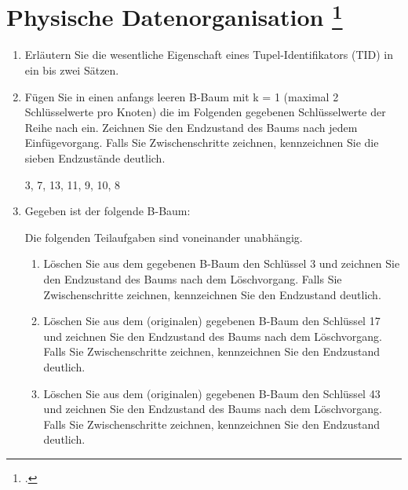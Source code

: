 \documentclass{lehramt-informatik-aufgabe}
\begin{document}
\liAufgabenTitel{}
\section{Physische Datenorganisation
\footcite{66116:2016:09}}
\begin{enumerate}


\item Erläutern Sie die wesentliche Eigenschaft eines
Tupel-Identifikators (TID) in ein bis zwei Sätzen.


\item Fügen Sie in einen anfangs leeren B-Baum mit k = 1 (maximal 2
Schlüsselwerte pro Knoten) die im Folgenden gegebenen Schlüsselwerte der
Reihe nach ein. Zeichnen Sie den Endzustand des Baums nach jedem
Einfügevorgang. Falls Sie Zwischenschritte zeichnen, kennzeichnen Sie
die sieben Endzustände deutlich.

3, 7, 13, 11, 9, 10, 8


\item Gegeben ist der folgende B-Baum:

Die folgenden Teilaufgaben sind voneinander unabhängig.
\begin{enumerate}

%

\item Löschen Sie aus dem gegebenen B-Baum den Schlüssel 3 und zeichnen
Sie den Endzustand des Baums nach dem Löschvorgang. Falls Sie
Zwischenschritte zeichnen, kennzeichnen Sie den Endzustand deutlich.

%

\item Löschen Sie aus dem (originalen) gegebenen B-Baum den Schlüssel 17
und zeichnen Sie den Endzustand des Baums nach dem Löschvorgang. Falls
Sie Zwischenschritte zeichnen, kennzeichnen Sie den Endzustand deutlich.

%

\item Löschen Sie aus dem (originalen) gegebenen B-Baum den Schlüssel 43
und zeichnen Sie den Endzustand des Baums nach dem Löschvorgang. Falls
Sie Zwischenschritte zeichnen, kennzeichnen Sie den Endzustand deutlich.
\end{enumerate}
\end{enumerate}
\end{document}
